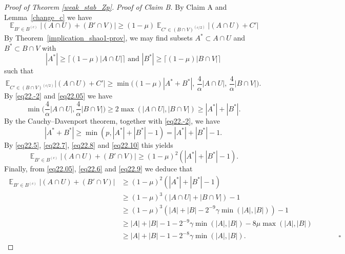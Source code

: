 \documentclass[12pt,reqno]{amsart}
\DeclareMathOperator*{\E}{\mathbb{E}}
\theoremstyle{definition}
\renewcommand\geq{\geqslant}
\begin{document}
\begin{proof}[Proof of Theorem \ref{weak_stab_Zp}]
\noindent
{\em Proof of Claim B.}
By Claim A and Lemma~\ref{change_c} we have
\begin{equation}\label{eq22.5}
    \E_{B'\in B^{(c)}} |(A\cap U)+(B'\cap V)| \geq (1-\mu)\E_{C'\in (B\cap V)^{(c/2)}}| (A\cap U)+C'|
\end{equation}
By Theorem~\ref{implication_shao1-prov}, we may find subsets $A^*\subset A\cap U$ and $B^*\subset B\cap V$ with
\begin{equation}\label{eq22.6}
    |A^*|\geq \lceil (1-\mu)|A\cap U|\rceil  \text{ and } |B^*|\geq \lceil (1-\mu)|B\cap V|\rceil
\end{equation}
such that
\begin{equation}\label{eq22.7}
    {\mathbb E}_{C'\in (B\cap V)^{(c/2)}}| (A\cap U)+C'| \geq \min \bigg((1-\mu)|A^*+B^*|\text{, } \frac{4}{\alpha}|A\cap U|\text{, } \frac{4}{\alpha}|B\cap V|\bigg).
\end{equation}
By \eqref{eq22.-2} and \eqref{eq22.05} we have
\begin{equation}\label{eq22.8}
\min\bigg(\frac{4}{\alpha}|A\cap U|,\frac{4}{\alpha}|B\cap V|\bigg) \geq 2\max(|A\cap U|,|B\cap V|) \geq |A^*|+|B^*|.
\end{equation}
By the Cauchy--Davenport theorem, together with \eqref{eq22.-2}, we have
\begin{equation}\label{eq22.10}
    |A^*+B^*|\geq \min(p,|A^*|+|B^*|-1)=|A^*|+|B^*|-1.
\end{equation}
By \eqref{eq22.5}, \eqref{eq22.7}, \eqref{eq22.8} and \eqref{eq22.10} this yields
\begin{equation}\label{eq22.9}
    \E_{B'\in B^{(c)}} |(A\cap U)+(B'\cap V)| \geq (1-\mu)^2(|A^*|+|B^*|-1).
\end{equation}
Finally, from \eqref{eq22.05}, \eqref{eq22.6} and \eqref{eq22.9} we deduce that
\begin{equation*}
\begin{split}
    \E_{B'\in B^{(c)}} |(A\cap U)+(B'\cap V)|  &\geq (1-\mu)^2(|A^*|+|B^*|-1) \\
    &\geq (1-\mu)^3(|A\cap U|+|B\cap V|)-1\\
    &\geq (1-\mu)^3(|A|+|B|-2^{-9}\gamma\min(|A|,|B|))-1\\
    &\geq |A|+|B|-1-2^{-9}\gamma \min(|A|,|B|)-8\mu \max(|A|,|B|)\\
    &\geq |A|+|B|-1-2^{-8}\gamma \min(|A|,|B|). \hspace{155pt}\square
\end{split}
\end{equation*}




\end{proof}
\end{document}
